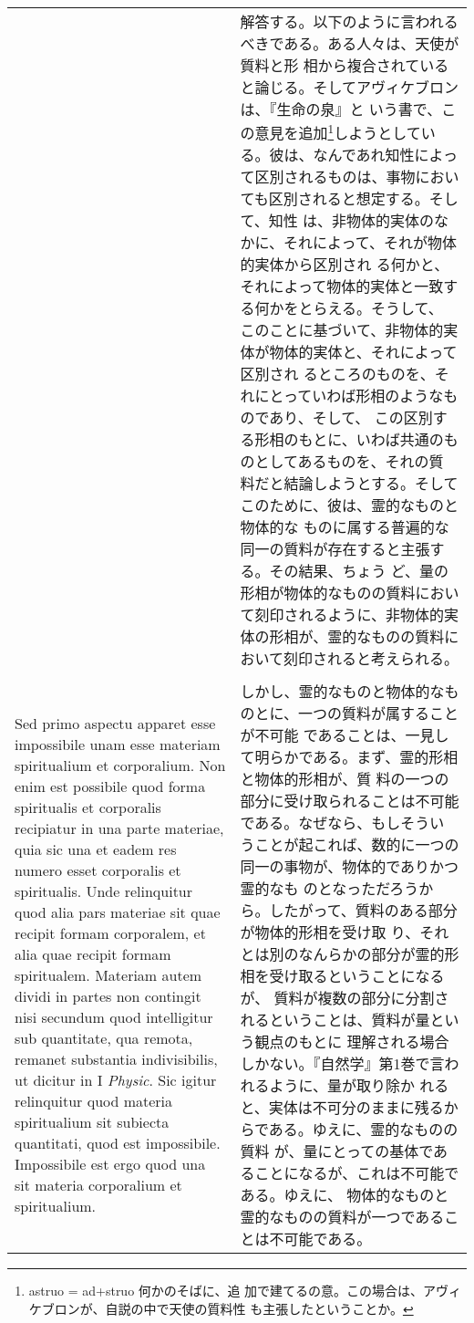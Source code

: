 \documentclass[10pt]{jsarticle} %
\begin{document}
\begin{longtable}{p{21em}p{21em}}
 &

 解答する。以下のように言われるべきである。ある人々は、天使が質料と形
 相から複合されていると論じる。そしてアヴィケブロンは、『生命の泉』と
 いう書で、この意見を追加\footnote{astruo = ad+struo 何かのそばに、追
 加で建てるの意。この場合は、アヴィケブロンが、自説の中で天使の質料性
 も主張したということか。}しようとしている。彼は、なんであれ知性によっ
 て区別されるものは、事物においても区別されると想定する。そして、知性
 は、非物体的実体のなかに、それによって、それが物体的実体から区別され
 る何かと、それによって物体的実体と一致する何かをとらえる。そうして、
 このことに基づいて、非物体的実体が物体的実体と、それによって区別され
 るところのものを、それにとっていわば形相のようなものであり、そして、
 この区別する形相のもとに、いわば共通のものとしてあるものを、それの質
 料だと結論しようとする。そしてこのために、彼は、霊的なものと物体的な
 ものに属する普遍的な同一の質料が存在すると主張する。その結果、ちょう
 ど、量の形相が物体的なものの質料において刻印されるように、非物体的実
 体の形相が、霊的なものの質料において刻印されると考えられる。

 \\\\

 Sed primo aspectu apparet esse impossibile unam esse materiam
 spiritualium et corporalium. Non enim est possibile quod forma
 spiritualis et corporalis recipiatur in una parte materiae, quia sic
 una et eadem res numero esset corporalis et spiritualis. Unde
 relinquitur quod alia pars materiae sit quae recipit formam
 corporalem, et alia quae recipit formam spiritualem. Materiam autem
 dividi in partes non contingit nisi secundum quod intelligitur sub
 quantitate, qua remota, remanet substantia indivisibilis, ut dicitur
 in I {\itshape Physic}. Sic igitur relinquitur quod materia
 spiritualium sit subiecta quantitati, quod est
 impossibile. Impossibile est ergo quod una sit materia corporalium et
 spiritualium.


 &

 しかし、霊的なものと物体的なものとに、一つの質料が属することが不可能
 であることは、一見して明らかである。まず、霊的形相と物体的形相が、質
 料の一つの部分に受け取られることは不可能である。なぜなら、もしそうい
 うことが起これば、数的に一つの同一の事物が、物体的でありかつ霊的なも
 のとなっただろうから。したがって、質料のある部分が物体的形相を受け取
 り、それとは別のなんらかの部分が霊的形相を受け取るということになるが、
 質料が複数の部分に分割されるということは、質料が量という観点のもとに
 理解される場合しかない。『自然学』第1巻で言われるように、量が取り除か
 れると、実体は不可分のままに残るからである。ゆえに、霊的なものの質料
 が、量にとっての基体であることになるが、これは不可能である。ゆえに、
 物体的なものと霊的なものの質料が一つであることは不可能である。



\end{longtable}
\end{document}
